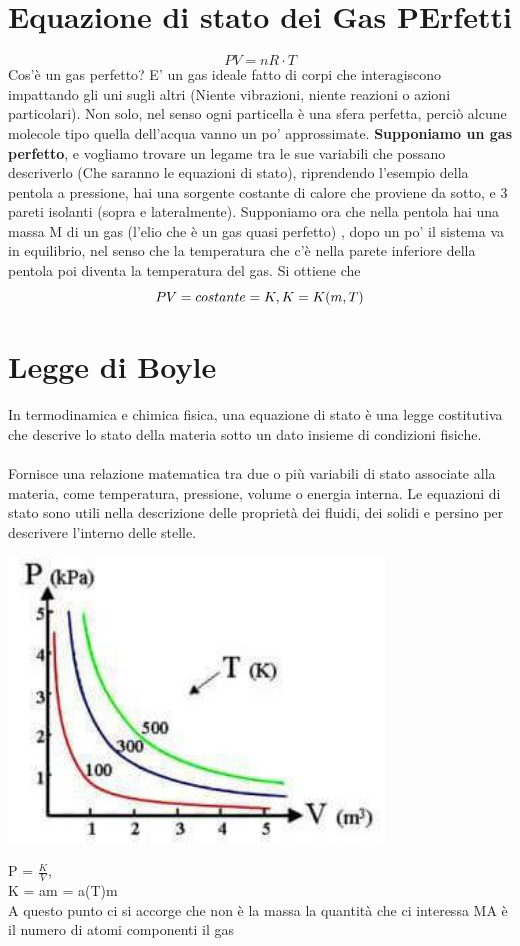 \documentclass[12pt, a4paper, openany, oneside]{book}
\begin{document}
\section{Equazione di stato dei Gas PErfetti}
\[
PV = nR\cdot T
\]
Cos'è un gas perfetto? E' un gas ideale fatto di corpi che interagiscono impattando
gli uni sugli altri (Niente vibrazioni, niente reazioni o azioni particolari).
Non solo, nel senso ogni particella è una sfera perfetta, perciò alcune molecole
tipo quella dell'acqua vanno un po' approssimate.
\textbf{Supponiamo un gas perfetto}, e vogliamo trovare un legame tra le sue 
variabili che possano descriverlo (Che saranno le equazioni di stato), riprendendo
l'esempio della pentola a pressione, hai una sorgente costante di  calore 
che proviene da sotto, e 3 pareti isolanti (sopra e lateralmente). Supponiamo 
ora che nella pentola hai una massa M di un gas (l'elio che è un gas quasi perfetto)
, dopo un po' il sistema va in equilibrio, nel senso che la temperatura che 
c'è nella parete inferiore della pentola poi diventa la temperatura del gas.
Si ottiene che
\[
PV = costante = K, \\
K = K(m, T)
\]
\section{Legge di Boyle}
In termodinamica e chimica fisica, una equazione di stato è una legge 
costitutiva che descrive lo stato della materia sotto un dato insieme di 
condizioni fisiche. 
\paragraph{}Fornisce una relazione matematica tra due o più variabili
di stato associate alla materia, come temperatura, pressione, volume o energia
interna. Le equazioni di stato sono utili nella descrizione delle proprietà 
dei fluidi, dei solidi e persino per descrivere l'interno delle stelle.
\begin{center}
\includegraphics[width=0.75\textwidth]{13}
\end{center}
P = $\frac{K}{V}$, \\
K = am = a(T)m \\
A questo punto ci si accorge che non è la massa la quantità che ci interessa MA
è il numero di atomi componenti il gas
\end{document}
